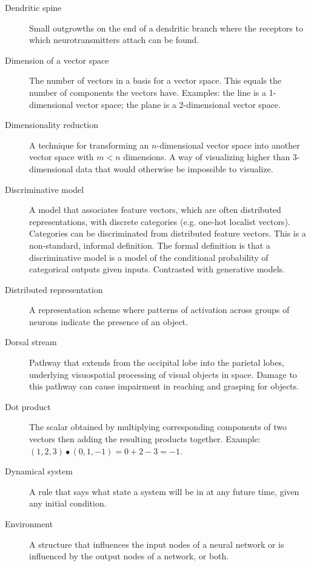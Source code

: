 \begin{description}
\item[Dendritic spine] Small outgrowths on the end of a dendritic branch where the receptors to which neurotransmitters attach can be found.

\item[Dimension of a vector space] The number of vectors in a basis for a vector space. This equals the number of components the vectors have. Examples: the line is a 1-dimensional vector space; the plane is a 2-dimensional vector space.

\item[Dimensionality reduction] A technique for transforming an $n$-dimensional vector space into another vector space with $m<n$ dimensions. A way of visualizing higher than 3-dimensional data that would otherwise be impossible to visualize.

\item[Discriminative model] A model that associates feature vectors, which are often distributed representations, with discrete categories (e.g. one-hot localist vectors).  Categories can be discriminated from distributed feature vectors. This is a non-standard, informal definition. The formal definition is that a discriminative model is a model of the conditional probability of categorical outputs given inputs. Contrasted with generative models.

\item[Distributed representation] A representation scheme where patterns of activation across groups of neurons indicate the presence of an object. 

\item[Dorsal stream] Pathway that extends from the occipital lobe into the parietal lobes, underlying visuospatial processing of visual objects in space. Damage to this pathway can cause impairment in reaching and grasping for objects. 

\item[Dot product] The scalar obtained by multiplying corresponding components of two vectors then adding the resulting products together. Example: $(1,2,3) \bullet (0,1,-1) = 0+2-3 = -1$.

\item[Dynamical system] A rule that says what state a system will be in at any future time, given any initial condition.

\item[Environment] A structure that influences the input nodes of a neural network or is influenced by the output nodes of a network, or both.


\end{description}
